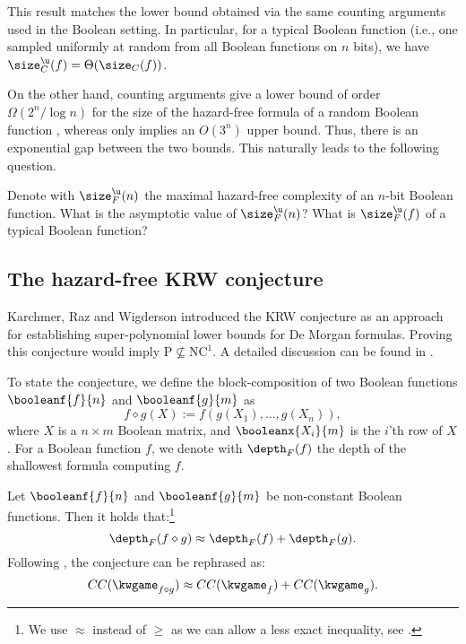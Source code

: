 \documentclass[acmsmall, nonacm, authorversion]{acmart}
\begin{document}
This result matches the lower bound obtained via the same counting arguments used in the Boolean setting. In particular, for a typical Boolean function (i.e., one sampled uniformly at random from all Boolean functions on $n$ bits), we have $\size_C^{\u}(f)=\Theta(\size_C(f))$.

On the other hand, counting arguments give a lower bound of order $\Omega(2^n/\log n)$ for the size of the hazard-free formula of a random Boolean function \cite{RS42,Sha49}, whereas  only implies an $O(3^n)$ upper bound. Thus, there is an exponential gap between the two bounds. This naturally leads to the following question. 

\begin{question}\label{que:universal-ub}
    Denote with $\size^\u_F(n)$ the maximal hazard-free complexity of an $n$-bit Boolean function. What is the asymptotic value of $\size^\u_F(n)$? What is $\size^\u_F(f)$ of a typical Boolean function?
\end{question}

\subsection{The hazard-free KRW conjecture}
Karchmer, Raz and Wigderson \cite{KRW95} introduced the KRW conjecture as an approach for establishing super-polynomial lower bounds for De Morgan formulas. Proving this conjecture would imply $\text{P}\not\subseteq \text{NC}^1$. A detailed discussion can be found in \cite{Mei20}. 

To state the conjecture, we define the block-composition of two Boolean functions $\booleanf{f}{n}$ and $\booleanf{g}{m}$ as
\[
f\diamond g(X):=f(g(X_1),\dots,g(X_n)),
\]
where $X$ is a $n\times m$ Boolean matrix, and $\booleanx{X_i}{m}$ is the $i$'th row of $X$. For a Boolean function $f$, we denote with $\depth_F(f)$ the depth of the shallowest formula computing $f$.

\begin{conjecture}\label{conj:krw}
Let $\booleanf{f}{n}$ and $\booleanf{g}{m}$ be non-constant Boolean functions. Then it holds that:\footnote{We use $\approx$ instead of $\geq$ as we can allow a less exact inequality, see \cite{KRW95, GMWW17}.} 
\[
\depth_F(f\diamond g)\approx \depth_F(f)+\depth_F(g).
\]
Following , the conjecture can be rephrased as:
\[
CC(\kwgame_{f\diamond g})\approx CC(\kwgame_f)+CC(\kwgame_g).
\]
\end{conjecture}
\end{document}
